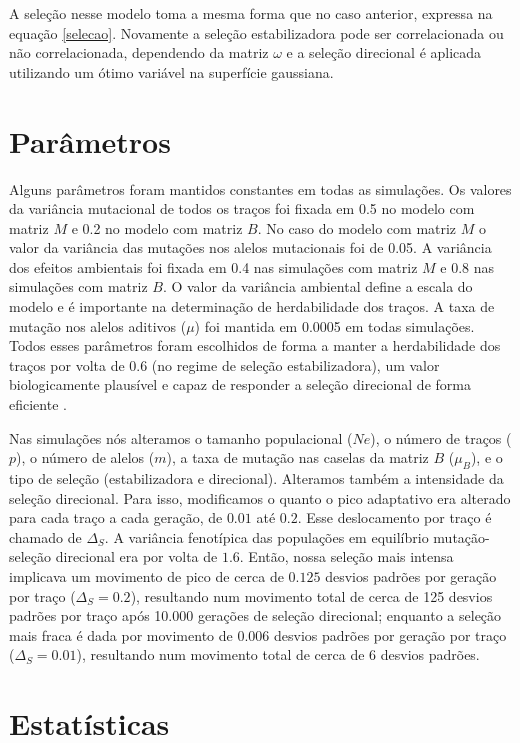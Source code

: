 A seleção nesse modelo toma a mesma forma que no caso anterior, expressa
na equação \ref{selecao}.
Novamente a seleção estabilizadora pode ser correlacionada ou não
correlacionada, dependendo da matriz $\omega$ e a seleção direcional é
aplicada utilizando um ótimo variável na superfície gaussiana.

\section{Parâmetros}

Alguns parâmetros foram mantidos constantes em todas as simulações.
Os valores da variância mutacional de todos os traços foi fixada em 0.5
no modelo com matriz $M$ e 0.2 no modelo com matriz $B$.
No caso do modelo com matriz $M$ o valor da variância das mutações nos
alelos mutacionais foi de 0.05.
A variância dos efeitos ambientais foi fixada em 0.4 nas simulações com
matriz $M$ e 0.8 nas simulações com matriz $B$.
O valor da variância ambiental define a escala do modelo e é importante
na determinação de herdabilidade dos traços.
A taxa de mutação nos alelos aditivos ($\mu$) foi mantida em 0.0005 em
todas simulações.
Todos esses parâmetros foram escolhidos de forma a manter a
herdabilidade dos traços por volta de 0.6 (no regime de seleção
estabilizadora), um valor biologicamente
plausível e capaz de responder a seleção direcional de forma eficiente
\citep{Cheverud1988}.

Nas simulações nós alteramos o tamanho populacional ($Ne$), o número de
traços ($p$), o número de alelos ($m$), a taxa de mutação nas caselas da
matriz $B$ ($\mu_B$), e o tipo de seleção (estabilizadora e direcional).
Alteramos também a intensidade da seleção direcional.
Para isso, modificamos o quanto o pico adaptativo era alterado para cada
traço a cada geração, de $0.01$ até $0.2$.
Esse deslocamento por traço é chamado de $\Delta_S$.
A variância fenotípica das populações em equilíbrio mutação-seleção
direcional era por volta de $1.6$.
Então, nossa seleção mais intensa implicava um movimento de pico de
cerca de $0.125$ desvios padrões por geração por traço ($\Delta_S=0.2$),
resultando num movimento total de cerca de 125 desvios padrões por traço
após 10.000 gerações de seleção direcional; enquanto a seleção mais
fraca é dada por movimento de $0.006$ desvios padrões por geração por traço
($\Delta_S=0.01$), resultando num movimento total de cerca de 6 desvios
padrões.

\section{Estatísticas}

